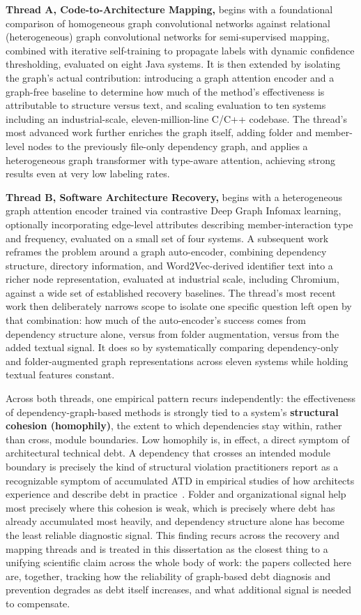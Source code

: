 \textbf{Thread A, Code-to-Architecture Mapping,} begins with a foundational comparison of homogeneous graph convolutional networks against relational (heterogeneous) graph convolutional networks for semi-supervised mapping, combined with iterative self-training to propagate labels with dynamic confidence thresholding, evaluated on eight Java systems. It is then extended by isolating the graph's actual contribution: introducing a graph attention encoder and a graph-free baseline to determine how much of the method's effectiveness is attributable to structure versus text, and scaling evaluation to ten systems including an industrial-scale, eleven-million-line C/C++ codebase. The thread's most advanced work further enriches the graph itself, adding folder and member-level nodes to the previously file-only dependency graph, and applies a heterogeneous graph transformer with type-aware attention, achieving strong results even at very low labeling rates.

\textbf{Thread B, Software Architecture Recovery,} begins with a heterogeneous graph attention encoder trained via contrastive Deep Graph Infomax learning, optionally incorporating edge-level attributes describing member-interaction type and frequency, evaluated on a small set of four systems. A subsequent work reframes the problem around a graph auto-encoder, combining dependency structure, directory information, and Word2Vec-derived identifier text into a richer node representation, evaluated at industrial scale, including Chromium, against a wide set of established recovery baselines. The thread's most recent work then deliberately narrows scope to isolate one specific question left open by that combination: how much of the auto-encoder's success comes from dependency structure alone, versus from folder augmentation, versus from the added textual signal. It does so by systematically comparing dependency-only and folder-augmented graph representations across eleven systems while holding textual features constant.

Across both threads, one empirical pattern recurs independently: the effectiveness of dependency-graph-based methods is strongly tied to a system's \textbf{structural cohesion (homophily)}, the extent to which dependencies stay within, rather than cross, module boundaries. Low homophily is, in effect, a direct symptom of architectural technical debt. A dependency that crosses an intended module boundary is precisely the kind of structural violation practitioners report as a recognizable symptom of accumulated ATD in empirical studies of how architects experience and describe debt in practice~\citep{verdecchia2020grounded}. Folder and organizational signal help most precisely where this cohesion is weak, which is precisely where debt has already accumulated most heavily, and dependency structure alone has become the least reliable diagnostic signal. This finding recurs across the recovery and mapping threads and is treated in this dissertation as the closest thing to a unifying scientific claim across the whole body of work: the papers collected here are, together, tracking how the reliability of graph-based debt diagnosis and prevention degrades as debt itself increases, and what additional signal is needed to compensate.

